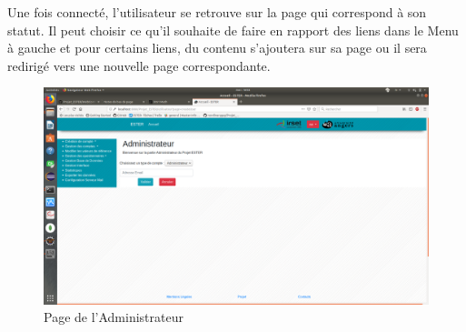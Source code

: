 Une fois connecté, l'utilisateur se retrouve sur la page qui correspond à son statut. Il peut choisir ce qu'il souhaite de faire en rapport des liens dans le Menu à gauche et pour certains liens, du contenu s'ajoutera sur sa page ou il sera redirigé vers une nouvelle page correspondante. 

\begin{figure}[H]
    \begin{center}
	\includegraphics[scale=0.2,trim=2.8cm 0.1cm 0.8cm 5.3cm, clip=true]{img/Admin}
    \end{center}
    \caption{Page de l'Administrateur}
\end{figure}


